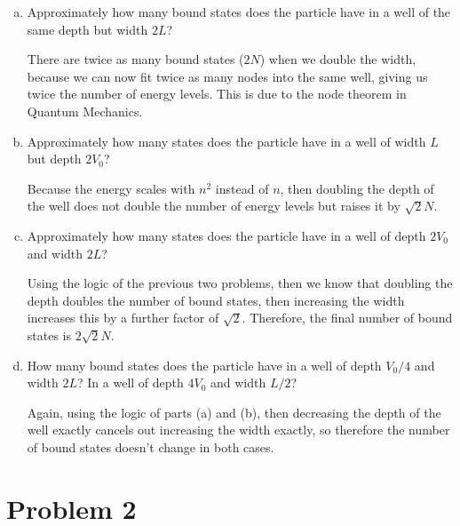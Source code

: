 \documentclass[10pt]{article}
\begin{document}
    \begin{enumerate}[(a)]
        \item Approximately how many bound states does the particle have in a well of the same depth but width $2L$?

        \begin{solution}
            There are twice as many bound states ($2N$) when we double the width, because we can now fit twice as many nodes into the same well, giving us twice the number of energy levels. This is due to the node theorem in Quantum Mechanics.
        \end{solution}
        \item Approximately how many states does the particle have in a well of width $L$ but depth $2V_0$?
        
        \begin{solution}
            Because the energy scales with $n^2$ instead of $n$, then doubling the depth of the well does not double the number of energy levels but raises it by $\sqrt{2}N$. 
        \end{solution}
        \item Approximately how many states does the particle have in a well of depth $2V_0$ and width $2L$?
        
        \begin{solution}
            Using the logic of the previous two problems, then we know that doubling the depth doubles the number of bound states, then increasing the width increases this by a further factor of $\sqrt 2$. Therefore, the final number of bound states is $2\sqrt{2}N$.
        \end{solution}
        \item How many bound states does the particle have in a well of depth $V_0/4$ and width $2L$? In a well of depth $4V_0$ and width $L/2$?
        
        \begin{solution}
            Again, using the logic of parts (a) and (b), then decreasing the depth of the well exactly cancels out increasing the width exactly, so therefore the number of bound states doesn't change in both cases.
        \end{solution}
    \end{enumerate}

    \pagebreak

    \section*{Problem 2}
\end{document}
